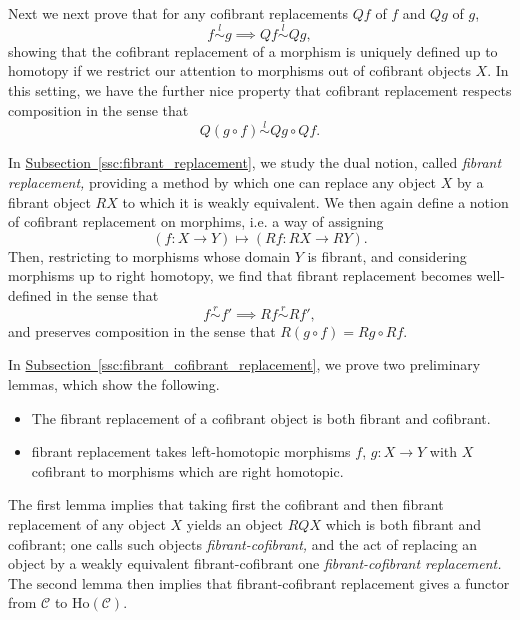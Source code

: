 \documentclass[main.tex]{subfiles}
\begin{document}
Next we next prove that for any cofibrant replacements $Qf$ of $f$ and $Qg$ of $g$,
\begin{equation*}
  f \overset{l}{\sim} g \implies Qf \overset{l}{\sim} Qg,
\end{equation*}
showing that the cofibrant replacement of a morphism is uniquely defined up to homotopy if we restrict our attention to morphisms out of cofibrant objects $X$. In this setting, we have the further nice property that cofibrant replacement respects composition in the sense that
\begin{equation*}
  Q(g \circ f) \overset{l}{\sim} Qg \circ Qf.
\end{equation*}

In \hyperref[ssc:fibrant_replacement]{Subsection~\ref*{ssc:fibrant_replacement}}, we study the dual notion, called \emph{fibrant replacement,} providing a method by which one can replace any object $X$ by a fibrant object $RX$ to which it is weakly equivalent. We then again define a notion of cofibrant replacement on morphims, i.e. a way of assigning
\begin{equation*}
  (f\colon X \to Y) \mapsto (Rf\colon RX \to RY).
\end{equation*}
Then, restricting to morphisms whose domain $Y$ is fibrant, and considering morphisms up to right homotopy, we find that fibrant replacement becomes well-defined in the sense that
\begin{equation*}
  f \overset{r}{\sim} f' \implies Rf \overset{r}{\sim} Rf',
\end{equation*}
and preserves composition in the sense that $R(g \circ f) = Rg \circ Rf$.

In \hyperref[ssc:fibrant_cofibrant_replacement]{Subsection~\ref*{ssc:fibrant_cofibrant_replacement}}, we prove two preliminary lemmas, which show the following.
\begin{itemize}
  \item The fibrant replacement of a cofibrant object is both fibrant and cofibrant.

  \item fibrant replacement takes left-homotopic morphisms $f$, $g\colon X \to Y$ with $X$ cofibrant to morphisms which are right homotopic.
\end{itemize}
The first lemma implies that taking first the cofibrant and then fibrant replacement of any object $X$ yields an object $RQX$ which is both fibrant and cofibrant; one calls such objects \emph{fibrant-cofibrant,} and the act of replacing an object by a weakly equivalent fibrant-cofibrant one \emph{fibrant-cofibrant replacement.} The second lemma then implies that fibrant-cofibrant replacement gives a functor from $\mathcal{C}$ to $\mathrm{Ho}(\mathcal{C})$.
\end{document}
